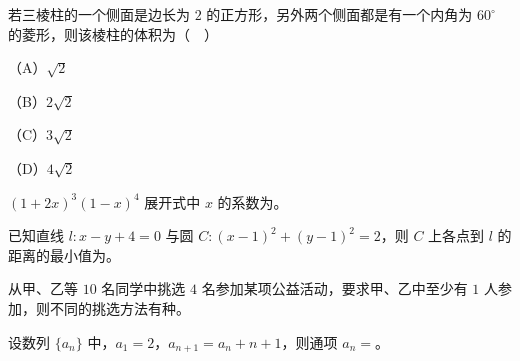 \begin{question}
若三棱柱的一个侧面是边长为 $2$ 的正方形，另外两个侧面都是有一个内角为 $60^\circ$ 的菱形，则该棱柱的体积为（　）

（A）$\sqrt2$

（B）$2\sqrt2$

（C）$3\sqrt2$

（D）$4\sqrt2$

\end{question}

\begin{question}
$(1+2x)^3(1-x)^4$ 展开式中 $x$ 的系数为\gkblank{}。

\end{question}
\begin{question}
已知直线 $l:x-y+4=0$ 与圆 $C:(x-1)^2+(y-1)^2=2$，则 $C$ 上各点到 $l$ 的距离的最小值为\gkblank{}。

\end{question}
\begin{question}
从甲、乙等 $10$ 名同学中挑选 $4$ 名参加某项公益活动，要求甲、乙中至少有 $1$ 人参加，则不同的挑选方法有\gkblank{}种。

\end{question}
\begin{question}
设数列 $\{a_n\}$ 中，$a_1=2$，$a_{n+1}=a_n+n+1$，则通项 $a_n=$\gkblank{}。

\end{question}

